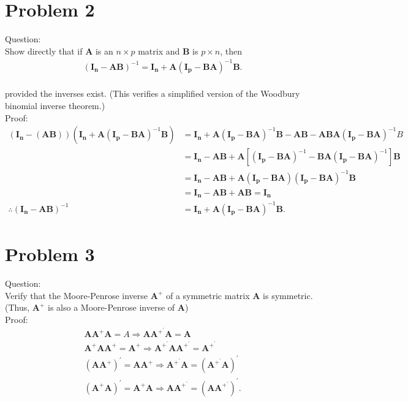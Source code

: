 \documentclass{article}
\begin{document}
\section{Problem 2}
Question:\\
Show directly that if $\bm{A}$ is an $n \times p$ matrix and $\bm{B}$
is $p \times n$, then\\
\begin{align*}
  &(\bm{I_{n}-AB})^{-1}=\bm{I_{n}}+\bm{A}(\bm{I_{p}-BA})^{-1}\bm{B}
  .
  \end{align*}\\
provided the inverses exist. (This verifies a simplified version of
the Woodbury binomial inverse theorem.)\\
Proof:\\
\begin{align*}
  (\bm{I_n}-(\bm{AB}))(\bm{I_n}+\bm{A}(\bm{I_p}-\bm{BA})^{-1}\bm{B})&=\bm{I_n}+\bm{A}(\bm{I_p}-\bm{BA})^{-1}\bm{B}-\bm{AB}-\bm{ABA}(\bm{I_p}-\bm{BA})^{-1}B\\
  &=\bm{I_n}-\bm{AB}+\bm{A}[(\bm{I_p}-\bm{BA})^{-1}-\bm{BA}(\bm{I_p}-\bm{BA})^{-1}]\bm{B}\\
  &=\bm{I_n}-\bm{AB}+\bm{A}(\bm{I_p}-\bm{BA})(\bm{I_p}-\bm{BA})^{-1}\bm{B}\\
  &=\bm{I_n}-\bm{AB}+\bm{AB}=\bm{I_n}\\
  \therefore (\bm{I_{n}-AB})^{-1}&=\bm{I_{n}}+\bm{A}(\bm{I_{p}-BA})^{-1}\bm{B}
  .
  \end{align*}
  
  
     
\section{Problem 3}
Question:\\
Verify that the Moore-Penrose inverse $\bm{A^{+}}$ of a symmetric
matrix $\bm{A}$ is symmetric. (Thus, $\bm{A^{+}}$ is also a
Moore-Penrose inverse of $\bm{A}$)\\
Proof:\\
\begin{align*}
  &\bm{AA^{+}A}=A\Rightarrow \bm{AA^{+^{\prime}}A}=\bm{A}\\
  &\bm{A^{+}AA^{+}}=\bm{A^{+}}\Rightarrow \bm{A^{+^{\prime}}AA^{+^{\prime}}}=\bm{A^{+^{\prime}}}\\
  &(\bm{AA^{+}})^{\prime}=\bm{AA^{+}}\Rightarrow \bm{A^{+^{\prime}}A}=(\bm{A^{+^{\prime}}A})^{\prime}\\
  &(\bm{A^{+}A})^{\prime}=\bm{A^{+}A}\Rightarrow \bm{AA^{+^{\prime}}}=(\bm{AA^{+^{\prime}}})^{\prime}
  .
  \end{align*}
  
\end{document}

